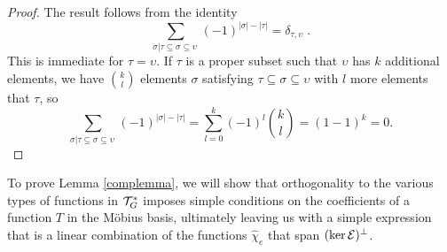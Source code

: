 \documentclass[12pt]{article}
\theoremstyle{definition}
\begin{document}
\begin{proof}
    The result follows from the identity
    \[
    \sum_{\sigma | \tau \subseteq \sigma \subseteq \upsilon \ } (-1)^{|\sigma| - |\tau|}  = \delta_{\tau, \upsilon} \; .
    \]
    This is immediate for $\tau = \upsilon$. If $\tau$ is a proper subset such that $\upsilon$ has $k$ additional elements, we have $\binom{k}{l}$ elements $\sigma$ satisfying $\tau \subseteq \sigma \subseteq \upsilon$ with $l$ more elements that $\tau$, so 
    \[
    \sum_{\sigma | \tau \subseteq \sigma \subseteq \upsilon \ } (-1)^{|\sigma| - |\tau|} = \sum_{l=0}^k (-1)^l \binom{k}{l} = (1 - 1)^k = 0.
    \]
\end{proof}
To prove Lemma \ref{complemma}, we will show that orthogonality to the various types of functions in ${\cal T}_G^*$ imposes simple conditions on the coefficients of a function $T$ in the Möbius basis, ultimately leaving us with a simple expression that is a linear combination of the functions $\hat{\chi}_e$ that span $(\ker {\cal E})^\perp$.
\end{document}
